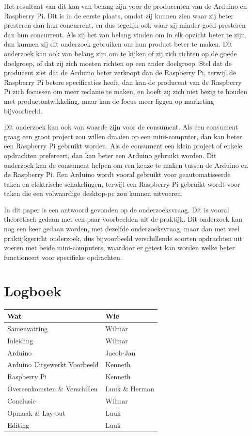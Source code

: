 \documentclass[a4paper, dutch, abstract=true]{scrartcl}
\begin{document}
Het resultaat van dit kan van belang zijn voor de producenten van de Arduino en Raspberry Pi.
Dit is in de eerste plaats, omdat zij kunnen zien waar zij beter presteren dan hun concurrent, en
dus tegelijk ook waar zij minder goed presteren dan hun concurrent.
Als zij het van belang vinden om in elk opzicht beter te zijn, dan kunnen zij dit onderzoek
gebruiken om hun product beter te maken.
Dit onderzoek kan ook van belang zijn om te kijken of zij zich richten op de goede doelgroep, of dat
zij zich moeten richten op een ander doelgroep.
Stel dat de producent ziet dat de Arduino beter verkoopt dan de Raspberry Pi, terwijl de Raspberry
Pi betere specificaties heeft, dan kan de producent van de Raspberry Pi zich focussen om meer
reclame te maken, en hoeft zij zich niet bezig te houden met productontwikkeling, maar kan de focus
meer liggen op marketing bijvoorbeeld.

Dit onderzoek kan ook van waarde zijn voor de consument.
Als een consument graag een groot project zou willen draaien op een mini-computer, dan kan beter een
Raspberry Pi gebruikt worden.
Als de consument een klein project of enkele opdrachten prefereert, dan kan beter een Arduino
gebruikt worden.
Dit onderzoek kan de consument helpen om een keuze te maken tussen de Arduino en de Raspberry Pi.
Een Arduino wordt vooral gebruikt voor geautomatiseerde taken en elektrische schakelingen, terwijl
een Raspberry Pi gebruikt wordt voor taken die een volwaardige desktop-pc zou kunnen uitvoeren.

In dit paper is een antwoord gevonden op de onderzoeksvraag.
Dit is vooral theoretisch gedaan met een paar voorbeelden uit de praktijk.
Dit onderzoek kan nog een keer gedaan worden, met dezelfde onderzoeksvraag, maar dan met veel
praktijkgericht onderzoek, dus bijvoorbeeld verschillende soorten opdrachten uit voeren met beide
mini-computers, waardoor er getest kan worden welke beter functioneert voor specifieke opdrachten.

\printbibliography

\section{Logboek}
\begin{tabular}{ll}
    \textbf{Wat}                  & \textbf{Wie}   \\
    \hline
    Samenvatting                  & Wilmar         \\
    Inleiding                     & Wilmar         \\
    Arduino                       & Jacob-Jan      \\
    Arduino Uitgewerkt Voorbeeld  & Kenneth        \\
    Raspberry Pi                  & Kenneth        \\
    Overeenkomsten \& Verschillen & Luuk \& Herman \\
    Conclusie                     & Wilmar         \\
    \hline
    Opmaak \& Lay-out             & Luuk           \\
    Editing                       & Luuk
\end{tabular}
\end{document}
